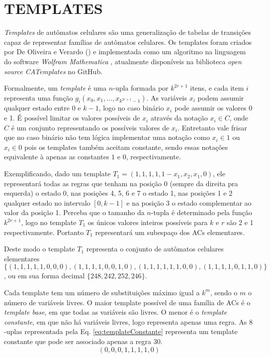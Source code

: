 \section{TEMPLATES}
\label{sec:templates}

\textit{Templates} de autômatos celulares são uma generalização de tabelas de transições capaz de representar famílias de autômatos celulares. Os templates foram criados por De Oliveira e Verardo (\citeyear{deOliveira2014}) e implementada como um algoritmo na linguagem do software \textit{Wolfram Mathematica} \cite{woframMathematica10}, atualmente disponíveis na biblioteca \textit{open source CATemplates} \cite{CATemplates} no GitHub.

Formalmente, um \textit{template} é uma $n$-upla formada por $k^{2r+1}$ itens, e cada item $i$ representa uma função $g_i(x_0,x_1,\dots,x_{k^{2r+1}-1})$. As variáveis $x_i$ podem assumir qualquer estado entre 0 e $k-1$, logo no caso binário $x_i$ pode assumir os valores 0 e 1. É possível limitar os valores possíveis de $x_i$ através da notação $x_i \in C$, onde $C$ é um conjunto representando os possíveis valores de $x_i$. Entretanto vale frisar que no caso binário não tem lógica implementar uma notação como $x_i \in {1}$ ou $x_i \in {0}$ pois os templates também aceitam constante, sendo essas notações equivalente à apenas as constantes $1$ e $0$, respectivamente.

Exemplificando, dado um template $T_1 = (1,1,1,1,1-x_1,x_2,x_1,0)$, ele representará todas as regras que tenham na posição 0 (sempre da direita pra esquerda) o estado 0, nas posições 4, 5, 6 e 7 o estado 1, nas posições 1 e 2 qualquer estado no intervalo $[0,k-1]$ e na posição 3 o estado complementar ao valor da posição 1. Perceba que o tamanho da $n$-tupla é determinado pela função $k^{2r+1}$, logo no template $T_1$ os únicos valores inteiros possíveis para $k$ e $r$ são 2 e 1 respectivamente. Portanto $T_1$ representará um subespaço dos ACs elementares.

Deste modo o template $T_1$ representa o conjunto de autômatos celulares elementares $\{(1,1,1,1,1,0,0,0),(1,1,1,1,0,0,1,0),(1,1,1,1,1,1,0,0),(1,1,1,1,0,1,1,0)\}$, ou em sua forma decimal $\{248,242,252,246\}$.

Cada template tem um número de substituições máximo igual a $k^m$, sendo o $m$ o número de variáveis livres. O maior template possível de uma família de ACs é o \textit{template base}, em que todas as variáveis são livres. O menor é o \textit{template constante}, em que não há variáveis livres, logo representa apenas uma regra. As $8$-uplas representada pela Eq. \eqref{eq:templateConstante} representa um template constante que pode ser associado apenas a regra 30. 
\begin{equation}
(0,0,0,1,1,1,1,0)
\label{eq:templateConstante}
\end{equation}

